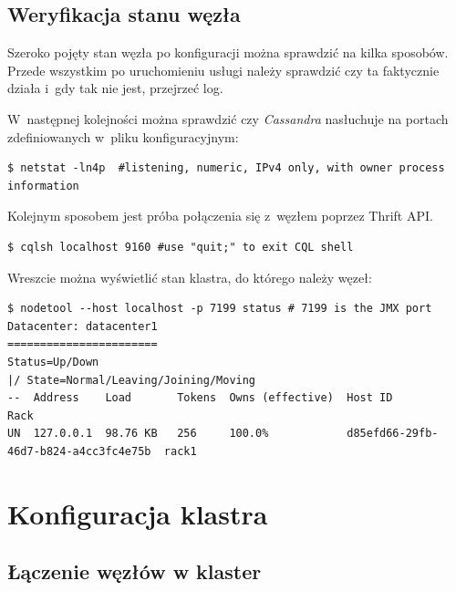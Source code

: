 \documentclass{article} %
\begin{document}
\subsection{Weryfikacja stanu węzła}\label{subsec:config_check}

Szeroko pojęty stan węzła po konfiguracji można sprawdzić na kilka sposobów.
Przede wszystkim po uruchomieniu usługi należy sprawdzić czy ta faktycznie działa i~gdy tak nie jest, przejrzeć log.

W~następnej kolejności można sprawdzić czy \emph{Cassandra} nasłuchuje na portach zdefiniowanych w~pliku konfiguracyjnym:

\begin{lstlisting}[style=bash, caption={sprawdzanie na których portach nasłuchuje \emph{Cassandra}}]
$ netstat -ln4p  #listening, numeric, IPv4 only, with owner process information
\end{lstlisting}

Kolejnym sposobem jest próba połączenia się z~węzłem poprzez Thrift API.

\begin{lstlisting}[style=bash, caption={dostęp do \emph{Cassandry} przez \emph{Thrift API}.}]
$ cqlsh localhost 9160 #use "quit;" to exit CQL shell
\end{lstlisting}

Wreszcie można wyświetlić stan klastra, do którego należy węzeł:

\begin{lstlisting}[style=bash, caption={sprawdzanie stanu klastra}]
$ nodetool --host localhost -p 7199 status # 7199 is the JMX port
Datacenter: datacenter1
=======================
Status=Up/Down
|/ State=Normal/Leaving/Joining/Moving
--  Address    Load       Tokens  Owns (effective)  Host ID                               Rack
UN  127.0.0.1  98.76 KB   256     100.0%            d85efd66-29fb-46d7-b824-a4cc3fc4e75b  rack1
\end{lstlisting}

\pagebreak

\section{Konfiguracja klastra}\label{sec:cluster}

\subsection{Łączenie węzłów w klaster}\label{subsec:cluster_connecting}
\end{document}
